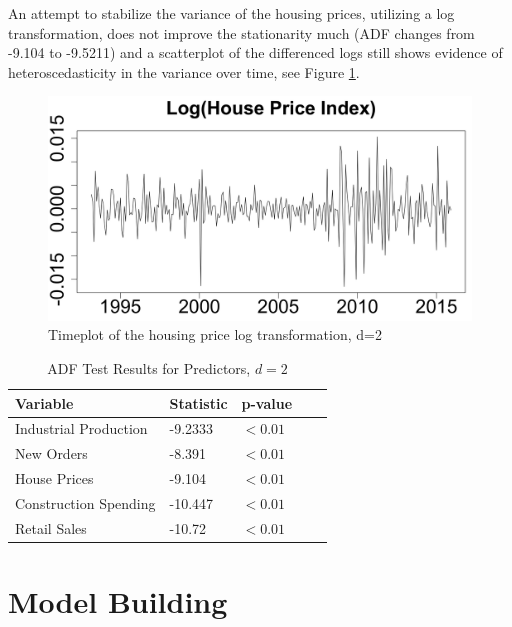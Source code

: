\documentclass[twoside,twocolumn]{article}
\begin{document}
An attempt to stabilize the variance of the housing prices, utilizing a log transformation, does not improve the stationarity much (ADF changes from -9.104 to -9.5211) and a scatterplot of the differenced logs still shows evidence of heteroscedasticity in the variance over time, see Figure \ref{fig:loghouse}.



		\begin{figure}[htb]
		\centering
		\caption{Timeplot of the housing price log transformation, d=2}
		\label{fig:loghouse}
		\includegraphics[width=.7\linewidth]{images/houseprice}
	\end{figure}



\begin{table}[H]
		 \centering
		 \caption{ADF Test Results for Predictors, \(d=2\)}
		 \label{tab:ADF2}
		 \begin{tabular}{lllll}
		 \hline
		 \textbf{Variable} & \textbf{Statistic}  & \textbf{p-value}\\ \hline
		  Industrial Production & -9.2333  &\( < 0.01\)\\
		  New Orders &  -8.391  & \( < 0.01\)\\
		  House Prices &  -9.104  & \( < 0.01\)\\
		  Construction Spending &  -10.447 &  \( < 0.01\)\\
		  Retail Sales &  -10.72 &  \( < 0.01\)\\ \hline
		 \end{tabular}
		 \end{table}







\section{Model Building}
\end{document}

